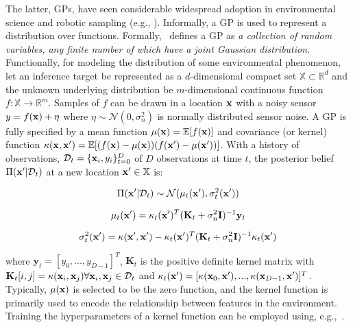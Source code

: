 The latter, GPs, have seen considerable widespread adoption in environmental science and robotic sampling (e.g., \cite{Srinivas2012,Krause2008,ouyang2014multi,kleiber2012daily,cahill2015modeling,wan2017reduced, ma2017informative, Marchant2014a,flaspohler2019information,luo2018adaptive,guestrin2005near}). Informally, a GP is used to represent a distribution over functions. Formally,~\cite{Rasmussen2004} defines a GP as \emph{a collection of random variables, any finite number of which have a joint Gaussian distribution.} Functionally, for modeling the distribution of some environmental phenomenon, let an inference target be represented as a $d$-dimensional compact set $\mathbb{X} \subset \mathbb{R}^d$ and the unknown underlying distribution be $m$-dimensional continuous function $f : \mathbb{X} \longrightarrow \mathbb{R}^m$. Samples of $f$ can be drawn in a location $\mathbf{x}$ with a noisy sensor $y = f(\mathbf{x}) + \eta$ where $\eta \sim \mathcal{N}(0, \sigma_n^2)$ is normally distributed sensor noise. A GP is fully specified by a mean function $\mu(\mathbf{x}) = \mathbb{E}[f(\mathbf{x})]$ and covariance (or kernel) function $\kappa(\mathbf{x},\mathbf{x}') = \mathbb{E}[(f(\mathbf{x}) - \mu(\mathbf{x}))(f(\mathbf{x}') - \mu(\mathbf{x}'))]$. With a history of observations, $\mathcal{D}_t = \{\mathbf{x}_i, y_i\}_{t=0}^D$ of $D$ observations at time $t$, the posterior belief $\Pi(\mathbf{x}' | \mathcal{D}_t)$ at a new location $\mathbf{x}' \in \mathbb{X}$ is:

\begin{equation}
    \Pi(\mathbf{x}' | \mathcal{D}_t) \sim \mathcal{N}(\mu_t(\mathbf{x}'),\sigma_t^2(\mathbf{x}'))
\end{equation}

\begin{equation}
    \mu_t(\mathbf{x}') = \kappa_t(\mathbf{x}')^T(\mathbf{K}_t + \sigma_n^2\mathbf{I})^{-1}\mathbf{y}_t
\end{equation}

\begin{equation}
    \sigma_t^2(\mathbf{x}') = \kappa(\mathbf{x}',\mathbf{x}') - \kappa_t(\mathbf{x}')^T(\mathbf{K}_t + \sigma_n^2 \mathbf{I})^{-1}\kappa_t(\mathbf{x}')
\end{equation}

\noindent where $\mathbf{y}_t = [y_0,...,y_{D-1}]^T$, $\mathbf{K}_t$ is the positive definite kernel matrix with $\mathbf{K}_t[i,j] = \kappa(\mathbf{x}_i,\mathbf{x}_j) \forall \mathbf{x}_i,\mathbf{x}_j \in \mathcal{D}_t$ and $\kappa_t(\mathbf{x}') = [\kappa(\mathbf{x}_0,\mathbf{x}'), ..., \kappa(\mathbf{x}_{D-1},\mathbf{x}')]^T$. Typically, $\mu(\mathbf{x})$ is selected to be the zero function, and the kernel function is primarily used to encode the relationship between features in the environment. Training the hyperparameters of a kernel function can be employed using, e.g.,~\cite{bergstra2011algorithms}.

